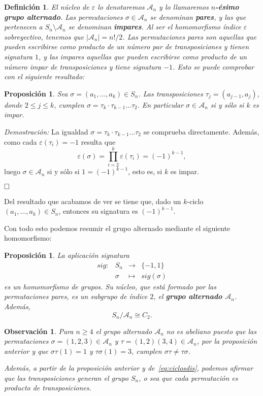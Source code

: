 \documentclass[12pt]{article}
\newtheorem{proposition}[theorem]{Proposición}
\newtheorem{definition}[theorem]{Definición}
\newtheorem{observation}{Observación}[theorem]
\begin{document}
\begin{definition}El núcleo de $\varepsilon$ lo denotaremos $\mathcal{A}_{n}$ y lo llamaremos \textbf{$n$-ésimo grupo alternado}. Las permutaciones $\sigma \in \mathcal{A}_{n}$ se denominan \textbf{pares}, y las que pertenecen a $S_{n} \setminus \mathcal{A}_{n}$ se denominan \textbf{impares}. Al ser el homomorfismo índice $\varepsilon$ sobreyectivo, tenemos que $|\mathcal{A}_{n}| = n!/2$. Las permutaciones pares son aquellas que pueden escribirse como producto de un número par de transposiciones y tienen signatura $1$, y las impares aquellas que pueden escribirse como producto de un número impar de transposiciones y tiene signatura $-1$. Esto se puede comprobar con el siguiente resultado:
\end{definition}

\begin{proposition}\label{eq:cicimpar} Sea $\sigma = (a_{1}, \ldots, a_{k}) \in S_{n}$. Las transposiciones $\tau_{j} = (a_{j-1}, a_{j})$, donde $2\leq j \leq k$, cumplen $\sigma = \tau_{k} \cdot \tau_{k-1} \ldots \tau_{2}.$ En particular $\sigma \in \mathcal{A}_{n}$ si y sólo si $k$ es impar.
\end{proposition}
\emph{Demostración: }La igualdad $\sigma = \tau_{k} \cdot \tau_{k-1} \ldots \tau_{2}$ se comprueba directamente. Además, como cada $\varepsilon(\tau_{i}) = -1$ resulta que $$\varepsilon(\sigma) = \prod_{i=2}^{k}\varepsilon(\tau_{i}) = (-1)^{k-1},$$ luego $\sigma \in \mathcal{A}_{n}$ si y sólo si $1 = (-1)^{k-1}$, esto es, si $k$ es impar.

$\hfill \square$

Del resultado que acabamos de ver se tiene que, dado un $k$-ciclo $(a_{1}, \ldots, a_{k}) \in S_{n}$, entonces su signatura es $(-1)^{k-1}$.

Con todo esto podemos resumir el grupo alternado mediante el siguiente homomorfismo:
\begin{proposition}La aplicación signatura $$\begin{array}{rccl}
sig \colon &S_{n}& \longrightarrow &\lbrace -1, 1\rbrace\\
&\sigma& \longmapsto &sig(\sigma)
\end{array}
$$
es un homomorfismo de grupos. Su núcleo, que está formado por las permutaciones pares, es un subgrupo de índice $2$, el \textbf{grupo alternado $\mathcal{A}_{n}$}. Además, $$S_{n}/\mathcal{A}_{n} \cong C_{2}.$$
\end{proposition}


\begin{observation} Para $n \geq 4$ el grupo alternado $\mathcal{A}_{n}$ no es abeliano puesto que las permutaciones $\sigma = (1,2,3) \in \mathcal{A}_{n}$ y $\tau = (1,2)(3,4) \in \mathcal{A}_{n}$, por la proposición anterior y que $\sigma\tau(1) = 1$ y $\tau\sigma(1)=3$, cumplen $\sigma\tau \neq \tau\sigma$.

Además, a partir de la proposición anterior y de~\ref{eq:ciclosdis}, podemos afirmar que las transposiciones generan el grupo $S_{n}$, o sea que cada permutación es producto de transposiciones.
\end{observation}
\end{document}
